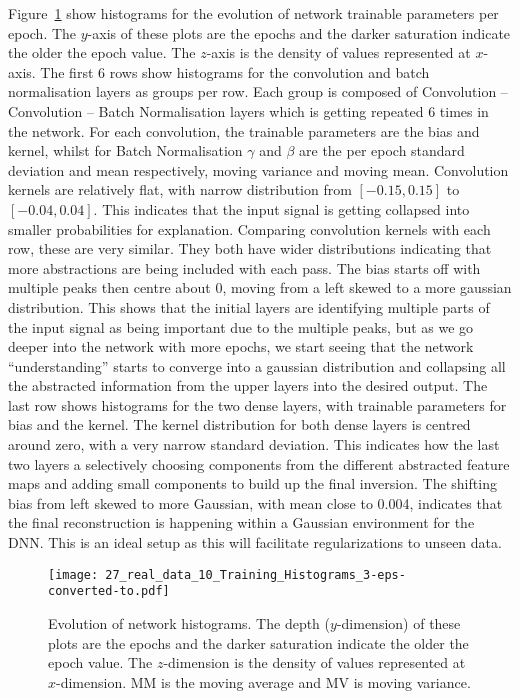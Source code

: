 Figure~\ref{fig:marm_evolution_network_historgrams} show histograms for the evolution of network trainable parameters per epoch. The $y$-axis of these plots are the epochs and the darker saturation indicate the older the epoch value. The $z$-axis is the density of values represented at $x$-axis. The first 6 rows show histograms for the convolution and batch normalisation layers as groups per row. Each group is composed of Convolution – Convolution – Batch Normalisation layers which is getting repeated 6 times in the network. For each convolution, the trainable parameters are the bias and kernel, whilst for Batch Normalisation $\gamma$ and $\beta$ are the per epoch standard deviation and mean respectively, moving variance and moving mean. Convolution kernels are relatively flat, with narrow distribution from $\left[-0.15, 0.15\right]$ to $\left[-0.04, 0.04\right]$. This indicates that the input signal is getting collapsed into smaller probabilities for explanation. Comparing convolution kernels with each row, these are very similar. They both have wider distributions indicating that more abstractions are being included with each pass. The bias starts off with multiple peaks then centre about 0, moving from a left skewed to a more gaussian distribution. This shows that the initial layers are identifying multiple parts of the input signal as being important due to the multiple peaks, but as we go deeper into the network with more epochs, we start seeing that the network “understanding” starts to converge into a gaussian distribution and collapsing all the abstracted information from the upper layers into the desired output. The last row shows histograms for the two dense layers, with trainable parameters for bias and the kernel. The kernel distribution for both dense layers is centred around zero, with a very narrow standard deviation. This indicates how the last two layers a selectively choosing components from the different abstracted feature maps and adding small components to build up the final inversion. The shifting bias from left skewed to more Gaussian, with mean close to 0.004, indicates that the final reconstruction is happening within a Gaussian environment for the DNN. This is an ideal setup as this will facilitate regularizations to unseen data.

\begin{figure}[ht!]
    \centering
    \texttt{[image: 27\_real\_data\_10\_Training\_Histograms\_3-eps-converted-to.pdf]}
    \caption[Evolution of network histograms.]{Evolution of network histograms. The depth ($y$-dimension) of these plots are the epochs and the darker saturation indicate the older the epoch value. The $z$-dimension is the density of values represented at $x$-dimension.  MM is the moving average and MV is moving variance.}
    \label{fig:marm_evolution_network_historgrams}
\end{figure}

